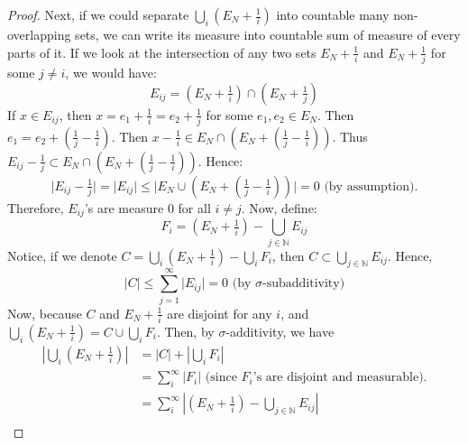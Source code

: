 \begin{answer}
\begin{proof}
        Next, if we could separate $\bigcup_i (E_N+\tfrac{1}{i})$ into countable many non-overlapping sets, we can write its measure into countable sum of measure of every parts of it. If we look at the intersection of any two sets $E_N + \tfrac{1}{i}$ and $E_N + \tfrac{1}{j}$ for some $j \neq i$, we would have:
        \begin{equation}
            E_{ij} = (E_N + \tfrac{1}{i}) \cap (E_N + \tfrac{1}{j})
        \end{equation}
        If $x \in E_{ij}$, then $x = e_1 + \tfrac{1}{i} = e_2 + \tfrac{1}{j}$ for some $e_1, e_2 \in E_N$. Then $e_1 = e_2 + (\tfrac{1}{j} - \tfrac{1}{i})$. Then $x - \tfrac{1}{i} \in E_N \cap (E_N + (\tfrac{1}{j} - \tfrac{1}{i}))$. Thus $E_{ij} - \tfrac{1}{j} \subset E_N  \cap (E_N + (\tfrac{1}{j} - \tfrac{1}{i}))$. Hence:
        \begin{equation}
            \lvert E_{ij} - \tfrac{1}{j} \rvert = \lvert E_{ij} \rvert \leq \lvert E_N \cup (E_N + (\tfrac{1}{j} - \tfrac{1}{i})) \rvert = 0 \text{ (by assumption)}.
        \end{equation}
        Therefore, $E_{ij}$'s are measure $0$ for all $i \neq j$. Now, define:
        \begin{equation}
            F_i = (E_N + \tfrac{1}{i}) - \bigcup_{j \in \mathbb{N}}E_{ij}
        \end{equation}
        Notice, if we denote $C = \bigcup_i (E_N + \tfrac{1}{i}) - \bigcup_{i} F_i$, then $C \subset \bigcup_{j \in \mathbb{N}} E_{ij}$. Hence,
        \begin{equation}
            \lvert C \rvert \leq \sum_{j = 1}^{\infty} \lvert E_{ij} \rvert = 0 \text{ (by $\sigma$-subadditivity)}
        \end{equation}
        Now, because $C$ and $E_N + \tfrac{1}{i}$ are disjoint for any $i$, and $\bigcup_i (E_N + \tfrac{1}{i}) = C \cup \bigcup_{i} F_i$. Then, by $\sigma$-additivity, we have
        \begin{equation}
            \begin{aligned}
                \left\lvert \bigcup_i (E_N + \tfrac{1}{i}) \right\rvert &= \left\lvert C \right\rvert + \left\lvert \bigcup_i F_i \right\rvert\\
                &= \sum_{i}^{\infty} \lvert F_i \rvert \text{ (since $F_i$'s are disjoint and measurable).}\\
                &= \sum_{i}^{\infty} \left\lvert (E_{N} + \tfrac{1}{i}) - \bigcup_{j \in \mathbb{N}}E_{ij}\right\rvert\\

\end{aligned}
\end{equation}
\end{proof}
\end{answer}
